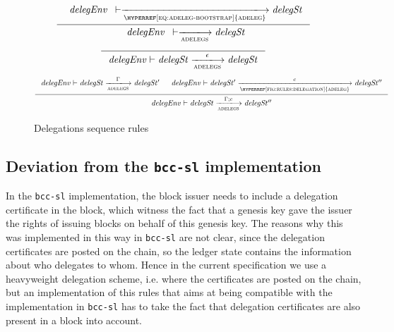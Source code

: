 \begin{figure}
  \begin{equation}
    \inference
    {
      {\begin{array}{l}
         \var{delegEnv}
      \end{array}}
      \vdash
      \trans{\hyperref[eq:adeleg-bootstrap]{adeleg}}{}
      \var{delegSt}
    }
    {
      {\begin{array}{l}
         \var{delegEnv}
      \end{array}}
      \vdash
      \trans{adelegs}{}
      \var{delegSt}
    }
  \end{equation}
  \nextdef
  \begin{equation}
    \label{eq:rule:delegation-seq-base}
    \inference
    {}
    {
      \var{delegEnv}
      \vdash
      \var{delegSt}
      \trans{adelegs}{\epsilon}
      \var{delegSt}
    }
  \end{equation}
  \nextdef
  \begin{equation}
    \label{eq:rule:delegation-seq-ind}
    \inference
    {
      \var{delegEnv}
      \vdash
      \var{delegSt}
      \trans{adelegs}{\Gamma}
      \var{delegSt'}
      &
      \var{delegEnv}
      \vdash
      \var{delegSt'}
      \trans{\hyperref[fig:rules:delegation]{adeleg}}{c}
      \var{delegSt''}
    }
    {
      \var{delegEnv}
      \vdash
      \var{delegSt}
      \trans{adelegs}{\Gamma; c}
      \var{delegSt''}
    }
  \end{equation}
  \caption{Delegations sequence rules}
  \label{fig:rules:delegation-seq}
\end{figure}

\subsection{Deviation from the \texttt{bcc-sl} implementation}
\label{sec:delegation:deviation-bcc-sl-imp}

In the \texttt{bcc-sl} implementation, the block issuer needs to include a
delegation certificate in the block, which witness the fact that a genesis key
gave the issuer the rights of issuing blocks on behalf of this genesis key. The
reasons why this was implemented in this way in \texttt{bcc-sl} are not
clear, since the delegation certificates are posted on the chain, so the ledger
state contains the information about who delegates to whom. Hence in the
current specification we use a heavyweight delegation scheme, i.e. where the
certificates are posted on the chain, but an implementation of this rules that
aims at being compatible with the implementation in \texttt{bcc-sl} has to
take the fact that delegation certificates are also present in a block into
account.

